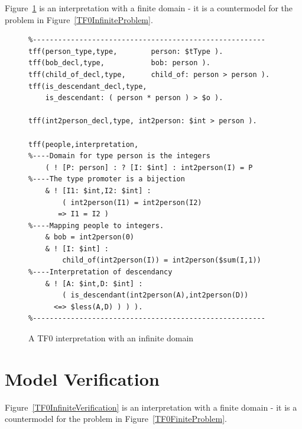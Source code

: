 \documentclass[letterpaper]{article}
\begin{document}
Figure~\ref{TF0InfiniteInterpretation} is an interpretation with a finite domain - it is a 
countermodel for the problem in Figure~\ref{TF0InfiniteProblem}.

\begin{figure}[htbp]
\scriptsize
{}
\begin{verbatim}
%-------------------------------------------------------
tff(person_type,type,        person: $tType ).
tff(bob_decl,type,           bob: person ).
tff(child_of_decl,type,      child_of: person > person ).
tff(is_descendant_decl,type, 
    is_descendant: ( person * person ) > $o ).

tff(int2person_decl,type, int2person: $int > person ).

tff(people,interpretation,
%----Domain for type person is the integers
    ( ! [P: person] : ? [I: $int] : int2person(I) = P
%----The type promoter is a bijection
    & ! [I1: $int,I2: $int] : 
        ( int2person(I1) = int2person(I2) 
       => I1 = I2 )
%----Mapping people to integers. 
    & bob = int2person(0)
    & ! [I: $int] : 
        child_of(int2person(I)) = int2person($sum(I,1))
%----Interpretation of descendancy
    & ! [A: $int,D: $int] : 
        ( is_descendant(int2person(A),int2person(D)) 
      <=> $less(A,D) ) ) ).
%-------------------------------------------------------
\end{verbatim}
\caption{A TF0 interpretation with an infinite domain}
\label{TF0InfiniteInterpretation}
\end{figure}


\section{Model Verification}
\label{Verification}

Figure~\ref{TF0InfiniteVerification} is an interpretation with a finite domain - it is a
countermodel for the problem in Figure~\ref{TF0FiniteProblem}.
\end{document}

